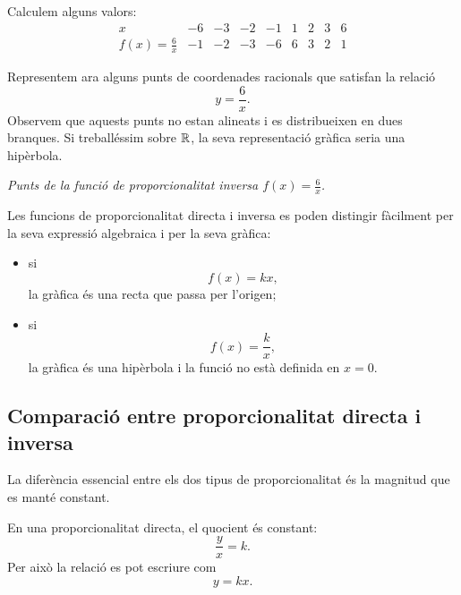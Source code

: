 \begin{solucio}
Calculem alguns valors:
\[
\begin{array}{c|cccccccc}
x & -6 & -3 & -2 & -1 & 1 & 2 & 3 & 6 \\
\hline
f(x)=\frac{6}{x} & -1 & -2 & -3 & -6 & 6 & 3 & 2 & 1
\end{array}
\]

Representem ara alguns punts de coordenades racionals que satisfan la relació
\[
	y=\frac{6}{x}.
\]
Observem que aquests punts no estan alineats i es distribueixen en dues branques. Si treballéssim sobre \(\mathbb{R}\), la seva representació gràfica seria una hipèrbola.

\begin{center}

\smallskip
\textit{Punts de la funció de proporcionalitat inversa \(f(x)=\frac{6}{x}\).}
\end{center}
\end{solucio}

\begin{observacio}
Les funcions de proporcionalitat directa i inversa es poden distingir fàcilment per la seva expressió algebraica i per la seva gràfica:
\begin{itemize}
	\item si
	\[
		f(x)=kx,
	\]
	la gràfica és una recta que passa per l'origen;
	\item si
	\[
		f(x)=\frac{k}{x},
	\]
	la gràfica és una hipèrbola i la funció no està definida en \(x=0\).
\end{itemize}
\end{observacio}

\subsection{Comparació entre proporcionalitat directa i inversa}

La diferència essencial entre els dos tipus de proporcionalitat és la magnitud que es manté constant.

En una proporcionalitat directa, el quocient és constant:
\[
	\frac{y}{x}=k.
\]
Per això la relació es pot escriure com
\[
	y=kx.
\]

